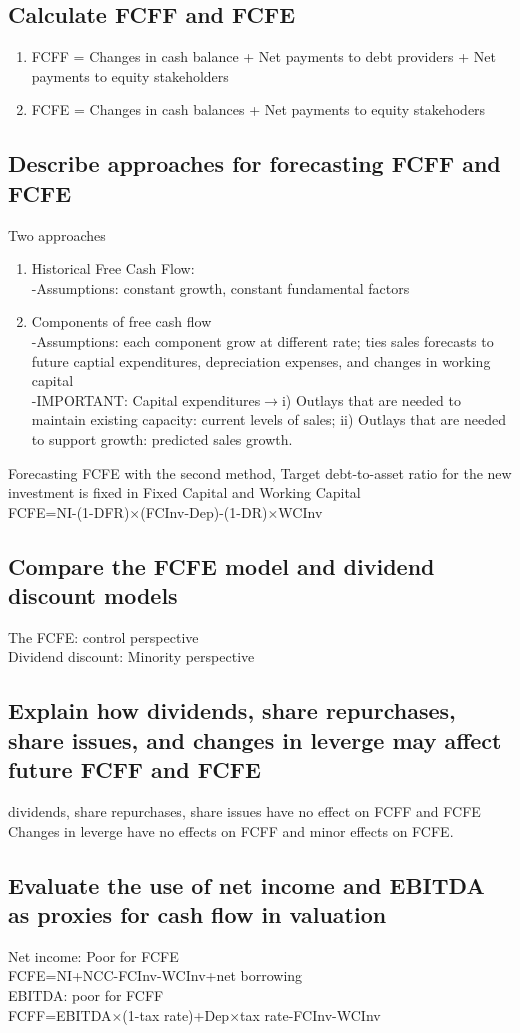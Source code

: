 \documentclass{article}
\newcommand{\be}{\begin{enumerate}}
\newcommand{\ee}{\end{enumerate}}
\newcommand{\ra}{$\rightarrow$}
\begin{document}
\subsection{Calculate FCFF and FCFE}
\be
    \item FCFF = Changes in cash balance + Net payments to debt providers
        + Net payments to equity stakeholders
    \item FCFE = Changes in cash balances + Net payments to equity stakehoders
\ee
\subsection{Describe approaches for forecasting FCFF and FCFE}
Two approaches
\be
    \item Historical Free Cash Flow:
        \\-Assumptions: constant growth, constant fundamental factors
    \item Components of free cash flow
        \\-Assumptions: each component grow at different rate; ties sales forecasts
        to future captial expenditures, depreciation expenses, and changes in working
        capital
        \\-IMPORTANT: Capital expenditures\ra i) Outlays that are needed to
        maintain existing capacity: current levels of sales; ii) Outlays that are
        needed to support growth: predicted sales growth.
\ee 
Forecasting FCFE with the second method, Target debt-to-asset ratio for the new
investment is fixed in Fixed Capital and Working Capital
\\FCFE=NI-(1-DFR)$\times$(FCInv-Dep)-(1-DR)$\times$WCInv
\subsection{Compare the FCFE model and dividend discount models}
The FCFE: control perspective\\
Dividend discount: Minority perspective
\subsection{Explain how dividends, share repurchases, share issues, and changes
in leverge may affect future FCFF and FCFE}
dividends, share repurchases, share issues have no effect on FCFF and FCFE
\\Changes in leverge have no effects on FCFF and minor effects on FCFE.
\subsection{Evaluate the use of net income and EBITDA as proxies for cash flow in valuation}
Net income: Poor for FCFE
\\FCFE=NI+NCC-FCInv-WCInv+net borrowing
\\EBITDA: poor for FCFF
\\FCFF=EBITDA$\times$(1-tax rate)+Dep$\times$tax rate-FCInv-WCInv
\end{document}

